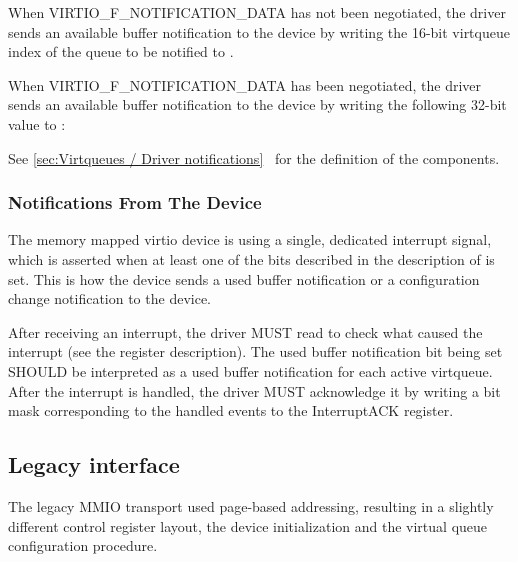When VIRTIO_F_NOTIFICATION_DATA has not been negotiated,
the driver sends an available buffer notification to the device by writing
the 16-bit virtqueue index
of the queue to be notified to .

When VIRTIO_F_NOTIFICATION_DATA has been negotiated,
the driver sends an available buffer notification to the device by writing
the following 32-bit value to :


See \ref{sec:Virtqueues / Driver notifications}~
for the definition of the components.

\subsubsection{Notifications From The Device}\label{sec:Virtio Transport Options / Virtio Over MMIO / MMIO-specific Initialization And Device Operation / Notifications From The Device}

The memory mapped virtio device is using a single, dedicated
interrupt signal, which is asserted when at least one of the
bits described in the description of 
is set. This is how the device sends a used buffer notification
or a configuration change notification to the device.

After receiving an interrupt, the driver MUST read
 to check what caused the interrupt (see the
register description).  The used buffer notification bit being set
SHOULD be interpreted as a used buffer notification for each active
virtqueue.  After the interrupt is handled, the driver MUST acknowledge
it by writing a bit mask corresponding to the handled events to the
InterruptACK register.

\subsection{Legacy interface}\label{sec:Virtio Transport Options / Virtio Over MMIO / Legacy interface}

The legacy MMIO transport used page-based addressing, resulting
in a slightly different control register layout, the device
initialization and the virtual queue configuration procedure.

